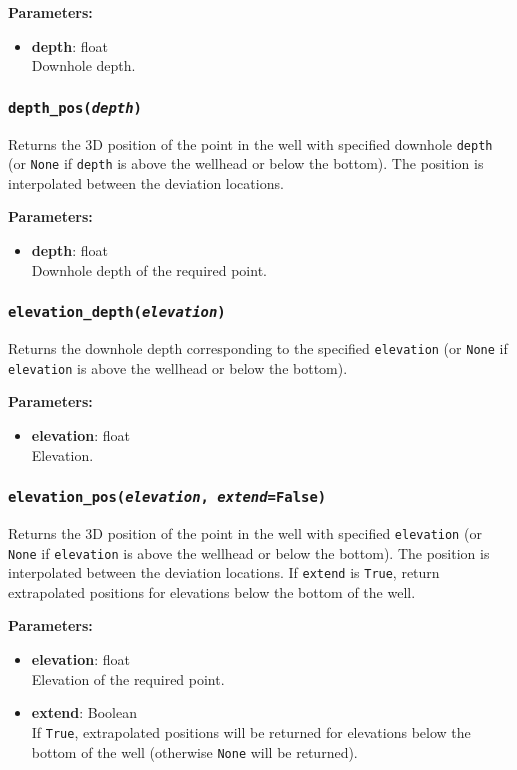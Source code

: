 \textbf{Parameters:}
\begin{itemize}
\item \textbf{depth}: float\\
  Downhole depth.
\end{itemize}

\subsubsection{\texttt{depth\_pos(\emph{depth})}}

Returns the 3D position of the point in the well with specified downhole \texttt{depth} (or \texttt{None} if \texttt{depth} is above the wellhead or below the bottom).  The position is interpolated between the deviation locations.

\textbf{Parameters:}
\begin{itemize}
\item \textbf{depth}: float\\
  Downhole depth of the required point.
\end{itemize}

\subsubsection{\texttt{elevation\_depth(\emph{elevation})}}

Returns the downhole depth corresponding to the specified \texttt{elevation} (or \texttt{None} if \texttt{elevation} is above the wellhead or below the bottom).

\textbf{Parameters:}
\begin{itemize}
\item \textbf{elevation}: float\\
  Elevation.
\end{itemize}

\subsubsection{\texttt{elevation\_pos(\emph{elevation}, \emph{extend}=\texttt{False})}}

Returns the 3D position of the point in the well with specified \texttt{elevation} (or \texttt{None} if \texttt{elevation} is above the wellhead or below the bottom).  The position is interpolated between the deviation locations.  If \texttt{extend} is \texttt{True}, return extrapolated positions for elevations below the bottom of the well.

\textbf{Parameters:}
\begin{itemize}
\item \textbf{elevation}: float\\
  Elevation of the required point.
\item \textbf{extend}: Boolean\\
  If \texttt{True}, extrapolated positions will be returned for elevations below the bottom of the well (otherwise \texttt{None} will be returned).
\end{itemize}

